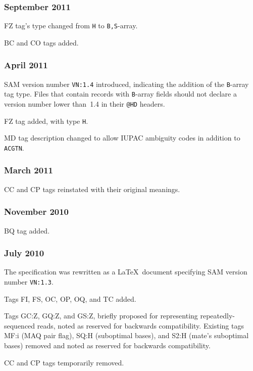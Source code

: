 \documentclass[10pt]{article}
\begin{document}
\begin{appendices}
\subsubsection*{September 2011}

FZ tag's type changed from {\tt H} to {\tt B,S}-array.

BC and CO tags added.

\subsubsection*{April 2011}

SAM version number {\tt VN:1.4} introduced, indicating the addition of the {\tt B}-array tag type.
Files that contain records with {\tt B}-array fields should not declare a version number lower than~1.4 in their {\tt @HD} headers.

\gap
FZ tag added, with type {\tt H}.

MD tag description changed to allow IUPAC ambiguity codes in addition to {\tt ACGTN}.

\subsubsection*{March 2011}

CC and CP tags reinstated with their original meanings.

\subsubsection*{November 2010}

BQ tag added.

\subsubsection*{July 2010}

The specification was rewritten as a \LaTeX\ document specifying SAM version number {\tt VN:1.3}.

\gap
Tags FI, FS, OC, OP, OQ, and TC added.

Tags GC:Z, GQ:Z, and GS:Z, briefly proposed for representing repeatedly-sequenced reads, noted as reserved for backwards compatibility.
Existing tags MF:i (MAQ pair flag), SQ:H (suboptimal bases), and S2:H (mate's suboptimal bases) removed and noted as reserved for backwards compatibility.

CC and CP tags temporarily removed.


\end{appendices}
\end{document}
